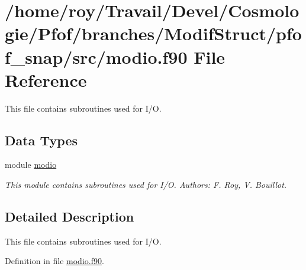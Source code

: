 \hypertarget{pfof__snap_2src_2modio_8f90}{\section{/home/roy/\-Travail/\-Devel/\-Cosmologie/\-Pfof/branches/\-Modif\-Struct/pfof\-\_\-snap/src/modio.f90 File Reference}
\label{pfof__snap_2src_2modio_8f90}
}


This file contains subroutines used for I/\-O.  


\subsection*{Data Types}
\begin{DoxyCompactItemize}
\item 
module \hyperlink{classmodio}{modio}
\begin{DoxyCompactList}\small\item\em This module contains subroutines used for I/\-O. Authors\-: F. Roy, V. Bouillot. \end{DoxyCompactList}\end{DoxyCompactItemize}


\subsection{Detailed Description}
This file contains subroutines used for I/\-O. 

Definition in file \hyperlink{pfof__snap_2src_2modio_8f90_source}{modio.\-f90}.

